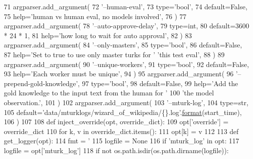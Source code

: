 \begin{DoxyCode}
{71     argparser.add\_argument(
72         \textcolor{stringliteral}{'--human-eval'},
73         type=\textcolor{stringliteral}{'bool'},
74         default=\textcolor{keyword}{False},
75         help=\textcolor{stringliteral}{'human vs human eval, no models involved'},
76     )
77     argparser.add\_argument(
78         \textcolor{stringliteral}{'--auto-approve-delay'},
79         type=int,
80         default=3600 * 24 * 1,
81         help=\textcolor{stringliteral}{'how long to wait for auto approval'},
82     )
83     argparser.add\_argument(
84         \textcolor{stringliteral}{'--only-masters'},
85         type=\textcolor{stringliteral}{'bool'},
86         default=\textcolor{keyword}{False},
87         help=\textcolor{stringliteral}{'Set to true to use only master turks for '} \textcolor{stringliteral}{'this test eval'},
88     )
89     argparser.add\_argument(
90         \textcolor{stringliteral}{'--unique-workers'},
91         type=\textcolor{stringliteral}{'bool'},
92         default=\textcolor{keyword}{False},
93         help=\textcolor{stringliteral}{'Each worker must be unique'},
94     )
95     argparser.add\_argument(
96         \textcolor{stringliteral}{'--prepend-gold-knowledge'},
97         type=\textcolor{stringliteral}{'bool'},
98         default=\textcolor{keyword}{False},
99         help=\textcolor{stringliteral}{'Add the gold knowledge to the input text from the human for '}
100         \textcolor{stringliteral}{'the model observation.'},
101     )
102     argparser.add\_argument(
103         \textcolor{stringliteral}{'--mturk-log'},
104         type=str,
105         default=\textcolor{stringliteral}{'data/mturklogs/wizard\_of\_wikipedia/\{\}.log'}.\hyperlink{namespaceparlai_1_1chat__service_1_1services_1_1messenger_1_1shared__utils_a32e2e2022b824fbaf80c747160b52a76}{format}(start\_time),
106     )
107 
108     \textcolor{keyword}{def }inject\_override(opt, override\_dict):
109         opt[\textcolor{stringliteral}{'override'}] = override\_dict
110         \textcolor{keywordflow}{for} k, v \textcolor{keywordflow}{in} override\_dict.items():
111             opt[k] = v
112 
113     \textcolor{keyword}{def }get\_logger(opt):
114         fmt = \textcolor{stringliteral}{'%
115         logfile = \textcolor{keywordtype}{None}
116         \textcolor{keywordflow}{if} \textcolor{stringliteral}{'mturk\_log'} \textcolor{keywordflow}{in} opt:
117             logfile = opt[\textcolor{stringliteral}{'mturk\_log'}]
118             \textcolor{keywordflow}{if} \textcolor{keywordflow}{not} os.path.isdir(os.path.dirname(logfile)):
}}
\end{DoxyCode}
